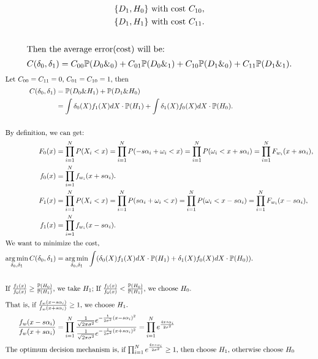 \documentclass[letter, 12pt]{article}
\DeclareMathOperator*{\argmin}{arg\,min}
\begin{document}
\begin{enumerate}[wide = 0pt, label = \textbf{Problem \arabic*:}]
\begin{subquestion}
\begin{gather*}
					 \lbrace D_1, H_0 \rbrace \text{ with cost } C_{10}, \\
					 \lbrace D_1, H_1 \rbrace \text{ with cost } C_{11}. \\
					 \\
					 \shortintertext{Then the average error(cost) will be:} 
					 C(\delta_0, \delta_1) = C_{00}\mathbb{P}(D_0\&_0) + C_{01}\mathbb{P}(D_0\&_1) + C_{10}\mathbb{P}(D_1\&_0) + C_{11}\mathbb{P}(D_1\&_1). 
				\end{gather*}
				\begin{align*}
					\shortintertext{Let $ C_{00} = C_{11} = 0$, $ C_{01} = C_{10} = 1 $, then} 
					C(\delta_0, \delta_1) &=  \mathbb{P}(D_0 \& H_1) + \mathbb{P}(D_1 \& H_0) \\
					&= \int\delta_0(X)f_1(X)dX \cdot \mathbb{P}(H_1) + \int\delta_1(X)f_0(X)dX \cdot \mathbb{P}(H_0). \\
					\\
					\shortintertext{By definition, we can get:} 
					F_0(x) &= \prod_{i=1}^{N}P(X_i < x) = \prod_{i=1}^{N}P(-s\alpha_i + \omega_i < x) = \prod_{i=1}^{N}P(\omega_i< x +s\alpha_i) = \prod_{i=1}^{N}F_{w_i}(x + s\alpha_i) ,\\
					f_0(x) &= \prod_{i=1}^{N}f_{w_i}(x + s\alpha_i) .\\
					F_1(x) &= \prod_{i=1}^{N}P(X_i < x) = \prod_{i=1}^{N}P(s\alpha_i + \omega_i < x) = \prod_{i=1}^{N}P(\omega_i< x -s\alpha_i) = \prod_{i=1}^{N}F_{w_i}(x - s\alpha_i) ,\\
					f_1(x) &= \prod_{i=1}^{N}f_{w_i}(x - s\alpha_i) .\\
					\shortintertext{We want to minimize the cost, }
					\argmin_{\delta_0, \delta_1} C(\delta_0, \delta_1) &= \argmin_{\delta_0, \delta_1} \int(\delta_0(X)f_1(X)dX \cdot \mathbb{P}(H_1) + \delta_1(X)f_0(X)dX \cdot \mathbb{P}(H_0)). \\
					\\
					\shortintertext{If $ \frac{f_1(x)}{f_0(x)} \ge \frac{\mathbb{P}(H_0)}{\mathbb{P}(H_1)} $, we take $ H_1 $; If $ \frac{f_1(x)}{f_0(x)} < \frac{\mathbb{P}(H_0)}{\mathbb{P}(H_1)} $, we choose $ H_0 $.}
					\shortintertext{That is, if $ \frac{f_w(x - s\alpha_i)}{f_w(x + s\alpha_i)} \ge 1 $, we choose $ H_1 $.}
					\frac{f_w(x - s\alpha_i)}{f_w(x + s\alpha_i)} &= \prod_{i=1}^{N} \frac{\frac{1}{\sqrt{2\pi\sigma^2}}e^{-\frac{1}{2\sigma^2}(x - s\alpha_i)^2}}{\frac{1}{\sqrt{2\pi\sigma^2}}e^{-\frac{1}{2\sigma^2}(x + s\alpha_i)^2}} = \prod_{i=1}^{N} e^{\frac{4xs\alpha_i}{2\sigma^2}}\\
					\shortintertext{The optimum decision mechanism is, if $ \prod_{i=1}^{N} e^{\frac{4xs\alpha_i}{2\sigma^2}} \ge 1 $, then choose $ H_1 $, otherwise choose $ H_0 $}

\end{align*}
\end{subquestion}
\end{enumerate}
\end{document}

